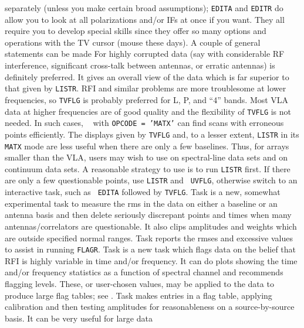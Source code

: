 separately (unless you make certain broad assumptions); {\tt EDITA}
and {\tt EDITR} do allow you to look at all polarizations and/or IFs
at once if you want.  They all require you to develop special skills
since they offer so many options and operations with the TV cursor
(mouse these days).  A couple of general statements can be
made
\xbit
\Item For highly corrupted data (say with considerable RF
    interference, significant cross-talk between antennas, or erratic
    antennas) {\tt {}} is definitely preferred.  It gives an
    overall view of the data which is far superior to that given by
    \hbox{{\tt LISTR}}.  RFI and similar problems are more troublesome
    at lower frequencies, so {\tt TVFLG} is probably preferred for L,
    P, and ``4'' bands.
\Item Most VLA data at higher frequencies are of good quality and
    the flexibility of {\tt TVFLG} is not needed.  In such cases, {\tt
    } with {\tt OPCODE = 'MATX'} can find scans with
    erroneous points efficiently.
\Item The displays given by {\tt TVFLG} and, to a lesser extent,
    {\tt LISTR} in its {\tt MATX} mode are less useful when there are
    only a few baselines.  Thus, for arrays smaller than the VLA,
    users may wish to use {\tt {}} on spectral-line data
    sets and {\tt {}} on continuum data sets.
\Item A reasonable strategy to use is to run {\tt LISTR} first.  If
    there are only a few questionable points, use {\tt LISTR} and {\tt
    UVFLG}, otherwise switch to an interactive task, such as {\tt
    EDITA} followed by \hbox{{\tt TVFLG}}.
\Item Task {\tt {}} is a new, somewhat experimental task to
    measure the rms in the data on either a baseline or an antenna
    basis and then delete seriously discrepant points and times when
    many antennas/correlators are questionable.  It also clips
    amplitudes and weights which are outside specified normal ranges.
    Task {\tt {}} reports the rmses and excessive values to
    assist in running {\tt FLAGR}\@.
\Item Task {\tt {}} is a new task which flags data on the
    belief that RFI is highly variable in time and/or frequency.  It
    can do plots showing the time and/or frequency statistics as a
    function of spectral channel and recommends flagging levels.
    These, or user-chosen values, may be applied to the data to
    produce large flag tables; see .
\Item Task {\tt {}} makes entries in a flag table, applying
    calibration and then testing amplitudes for reasonableness on a
    source-by-source basis.  It can be very useful for large data
